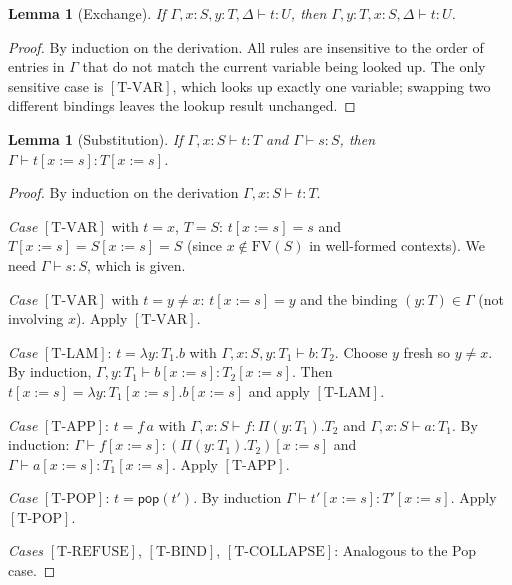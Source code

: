 \documentclass[12pt, a4paper, openany]{book}
\theoremstyle{plain}
\newtheorem{lemma}[theorem]{Lemma}
\theoremstyle{definition}
\theoremstyle{remark}
\begin{document}
\begin{lemma}[Exchange]
\label{lem:exchange}
If $\Gamma, x:S, y:T, \Delta \vdash t : U$, then
$\Gamma, y:T, x:S, \Delta \vdash t : U$.
\end{lemma}

\begin{proof}
By induction on the derivation. All rules are insensitive to the order of
entries in $\Gamma$ that do not match the current variable being looked up.
The only sensitive case is $[\mathrm{T\text{-}VAR}]$, which looks up exactly
one variable; swapping two different bindings leaves the lookup result unchanged.
\end{proof}

\begin{lemma}[Substitution]
\label{lem:substitution}
If $\Gamma, x:S \vdash t : T$ and $\Gamma \vdash s : S$, then
$\Gamma \vdash t[x := s] : T[x := s]$.
\end{lemma}

\begin{proof}
By induction on the derivation $\Gamma, x:S \vdash t : T$.

\textit{Case} $[\mathrm{T\text{-}VAR}]$ with $t = x$, $T = S$:
$t[x:=s] = s$ and $T[x:=s] = S[x:=s] = S$ (since $x \notin \mathrm{FV}(S)$
in well-formed contexts). We need $\Gamma \vdash s : S$, which is given.

\textit{Case} $[\mathrm{T\text{-}VAR}]$ with $t = y \neq x$:
$t[x:=s] = y$ and the binding $(y:T) \in \Gamma$ (not involving $x$).
Apply $[\mathrm{T\text{-}VAR}]$.

\textit{Case} $[\mathrm{T\text{-}LAM}]$: $t = \lambda y:T_1.b$ with
$\Gamma, x:S, y:T_1 \vdash b : T_2$. Choose $y$ fresh so $y \neq x$.
By induction, $\Gamma, y:T_1 \vdash b[x:=s] : T_2[x:=s]$.
Then $t[x:=s] = \lambda y:T_1[x:=s].b[x:=s]$ and apply $[\mathrm{T\text{-}LAM}]$.

\textit{Case} $[\mathrm{T\text{-}APP}]$: $t = f\, a$ with $\Gamma, x:S \vdash f :
\Pi(y:T_1).T_2$ and $\Gamma, x:S \vdash a : T_1$. By induction:
$\Gamma \vdash f[x:=s] : (\Pi(y:T_1).T_2)[x:=s]$ and
$\Gamma \vdash a[x:=s] : T_1[x:=s]$. Apply $[\mathrm{T\text{-}APP}]$.

\textit{Case} $[\mathrm{T\text{-}POP}]$: $t = \mathsf{pop}(t')$. By induction
$\Gamma \vdash t'[x:=s] : T'[x:=s]$. Apply $[\mathrm{T\text{-}POP}]$.

\textit{Cases} $[\mathrm{T\text{-}REFUSE}]$, $[\mathrm{T\text{-}BIND}]$,
$[\mathrm{T\text{-}COLLAPSE}]$: Analogous to the Pop case.
\end{proof}
\end{document}
